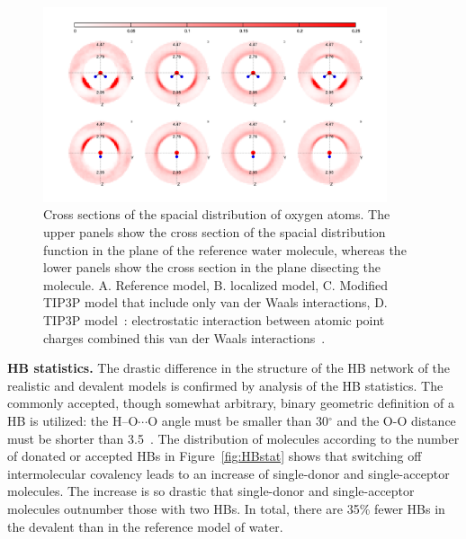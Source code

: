 \documentclass[aps,prl,reprint,amsmath,amssymb]{revtex4-1}
\begin{document}
\begin{figure}
\includegraphics[width=0.9\textwidth]{SDF}
\caption{Cross sections of the spacial distribution of oxygen atoms. 
The upper panels show the cross section of the spacial distribution function in the plane of the reference water molecule, whereas the lower panels show the cross section in the plane disecting the molecule. 
A. Reference model, B. localized model, C. Modified TIP3P model that include only van der Waals interactions, D. TIP3P model~\cite{TIP3P}: electrostatic interaction between atomic point charges combined this van der Waals interactions~\cite{TIP3P}.} \label{Fig:SDF}
\end{figure}


\textbf{HB statistics.} The drastic difference in the structure of the HB network of the realistic and devalent models is confirmed by analysis of the HB statistics. 
The commonly accepted, though somewhat arbitrary, binary geometric definition of a HB is utilized: the H--O$\cdots$O angle must be smaller than 30$^{\circ}$ and the O-O distance must be shorter than 3.5\Ang~\cite{rey2002hydrogen,lawrence2003vibrational}. 
The distribution of molecules according to the number of donated or accepted HBs in Figure~\ref{fig:HBstat} shows that switching off intermolecular covalency leads to an increase of single-donor and single-acceptor molecules. 
The increase is so drastic that single-donor and single-acceptor molecules outnumber those with two HBs.
In total, there are 35\% fewer HBs in the devalent than in the reference model of water.
\end{document}
